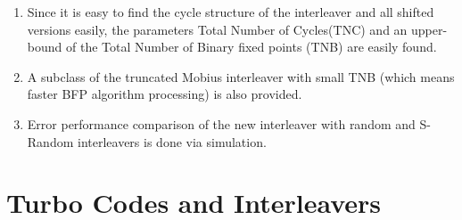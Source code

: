 \documentclass[fontsize=12pt]{article}
\begin{document}
\begin{enumerate}
\item Since it is easy to find the cycle structure of the interleaver and all shifted versions easily, the parameters Total Number of Cycles(TNC) and an upper-bound of the Total Number of Binary fixed points (TNB) are easily found.

\item A subclass of the truncated Mobius interleaver with small TNB (which means faster BFP algorithm processing) is also provided. 

\item Error performance comparison of the new interleaver with random and S-Random interleavers is done via simulation.
\end{enumerate}

\section{Turbo Codes and Interleavers}
\end{document}
